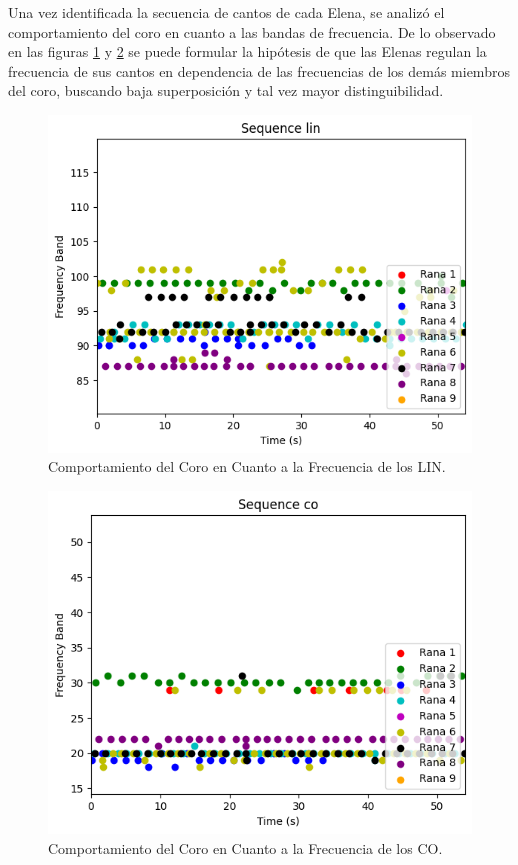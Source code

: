 \documentclass[a4paper,10pt,twocolumn]{article}
\begin{document}
Una vez identificada la secuencia de cantos de cada Elena, 
se analizó el comportamiento del coro en cuanto a las bandas de frecuencia.
De lo observado en las figuras \ref{fig:freqlin} y \ref{fig:freqco}
se puede formular la hipótesis de que las Elenas regulan la frecuencia de sus
cantos en dependencia de las frecuencias de los demás miembros del coro,
buscando baja superposición y tal vez mayor distinguibilidad.



\begin{figure}[h!]
    \centering
    \includegraphics[width=\columnwidth]{assets/frequencylin.png}
    \caption{Comportamiento del Coro en Cuanto a la Frecuencia de los LIN.}
    \label{fig:freqlin}
\end{figure}

\begin{figure}[h!]
    \centering
    \includegraphics[width=\columnwidth]{assets/frequencyco.png}
    \caption{Comportamiento del Coro en Cuanto a la Frecuencia de los CO.}
    \label{fig:freqco}
\end{figure}
\end{document}
